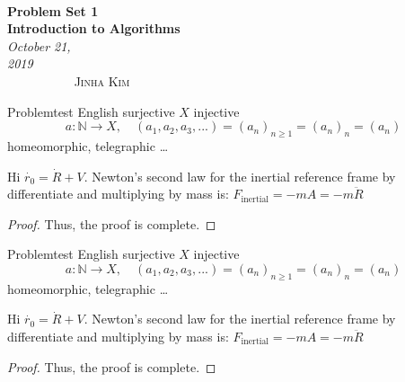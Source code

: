 \documentclass[11pt]{article}
\theoremstyle{definition}
\begin{document}
 

{\noindent\Huge\bf  \\[0.5\baselineskip] {\selectfont  Problem Set 1}         }\\[2\baselineskip] %
{ {\bf {}\selectfont Introduction to Algorithms}\\ {\textit{\selectfont     October 21, 2019}}}~~~~~~~~~~~~~~~~~~~~~~~~~~~~~~~~~~~~~~~~~~~~~~~~~~~~~~~~~~~~~~~~~~~~~~~~~~~~~    {\large \textsc{Jinha Kim}} %

\hrulefill

\begin{problem}{Problem}{test}
      English surjective $X$ injective
      \[ a:\mathbb{N} \rightarrow X, \quad (a_1,a_2,a_3,...) = (a_n)_{n \geq 1} = (a_n)_n = (a_n) \]
      homeomorphic, telegraphic \dots
\end{problem} 

\begin{ASolution}  
  Hi $\dot{r_0} = \dot{R} + V$. 
  Newton's second law for the inertial reference frame by differentiate and multiplying by mass is:
  $F_{\text{inertial}} = -mA = -m\ddot{R}$
\begin{proof}
Thus, the proof is complete. 
\end{proof} 
\end{ASolution} 

\begin{problem}{Problem}{test}
  English surjective $X$ injective
  \[ a:\mathbb{N} \rightarrow X, \quad (a_1,a_2,a_3,...) = (a_n)_{n \geq 1} = (a_n)_n = (a_n) \]
  homeomorphic, telegraphic \dots
\end{problem} 

\begin{ASolution}  
Hi $\dot{r_0} = \dot{R} + V$. 
Newton's second law for the inertial reference frame by differentiate and multiplying by mass is:
$F_{\text{inertial}} = -mA = -m\ddot{R}$
\begin{proof}
Thus, the proof is complete. 
\end{proof} 
\end{ASolution} 
\end{document}
